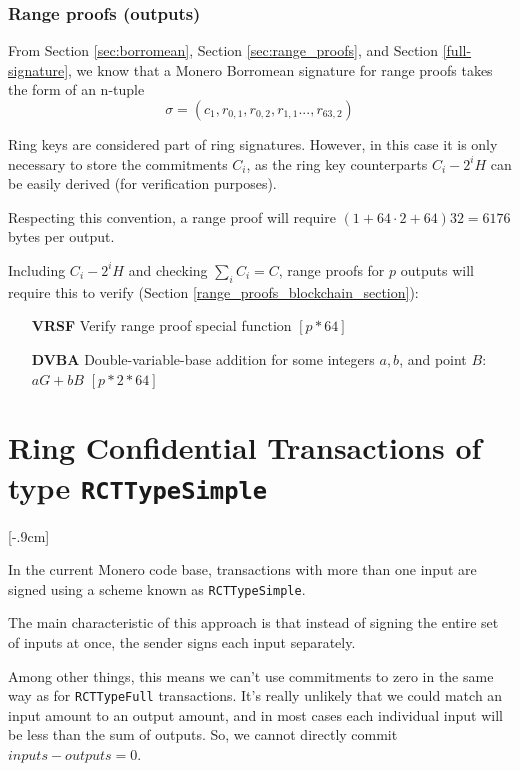 \subsubsection*{Range proofs (outputs)}

From Section \ref{sec:borromean}, Section \ref{sec:range_proofs}, and Section \ref{full-signature}, we know that a Monero Borromean signature for range proofs takes the form of an n-tuple\vspace{.2cm}%
\[\sigma = (c_1, r_{0, 1}, r_{0, 2}, r_{1, 1}..., r_{63, 2} )  \]

Ring keys are considered part of ring signatures. However, in this case it is only necessary to store the commitments $C_i$, as the ring key counterparts $C_i - 2^i H$ can be easily derived (for verification purposes).

Respecting this convention, a range proof will require \( ( 1 + 64 \cdot 2 + 64  ) 32 = 6176\) bytes per output.

Including $C_i - 2^i H$ and checking $\sum_i C_i = C$, range proofs for $p$ outputs will require this to verify (Section \ref{range_proofs_blockchain_section}):

\begin{itemize}
    \setlength\itemsep{\listspace}
    \item [\textbf{VRSF}] Verify range proof special function \quad \([p*64]\)
    \item [\textbf{DVBA}] Double-variable-base addition for some integers $a, b$, and point $B$: $a G + b B$ \quad \([p*2*64]\)
\end{itemize}


\section{Ring Confidential Transactions of type {\tt RCTTypeSimple}}[-.9cm]
\label{sec:RCTTypeSimple}

In the current Monero code base, transactions with more than one input are signed using a scheme known as {\tt RCTTypeSimple}.

The main characteristic of this approach is that instead of signing the entire set of inputs at once, the sender signs each input separately.

Among other things, this means we can’t use commitments to zero in the same way as for {\tt RCTTypeFull} transactions. It's really unlikely that we could match an input amount to an output amount, and in most cases each individual input will be less than the sum of outputs. So, we cannot directly commit $inputs - outputs = 0$.

